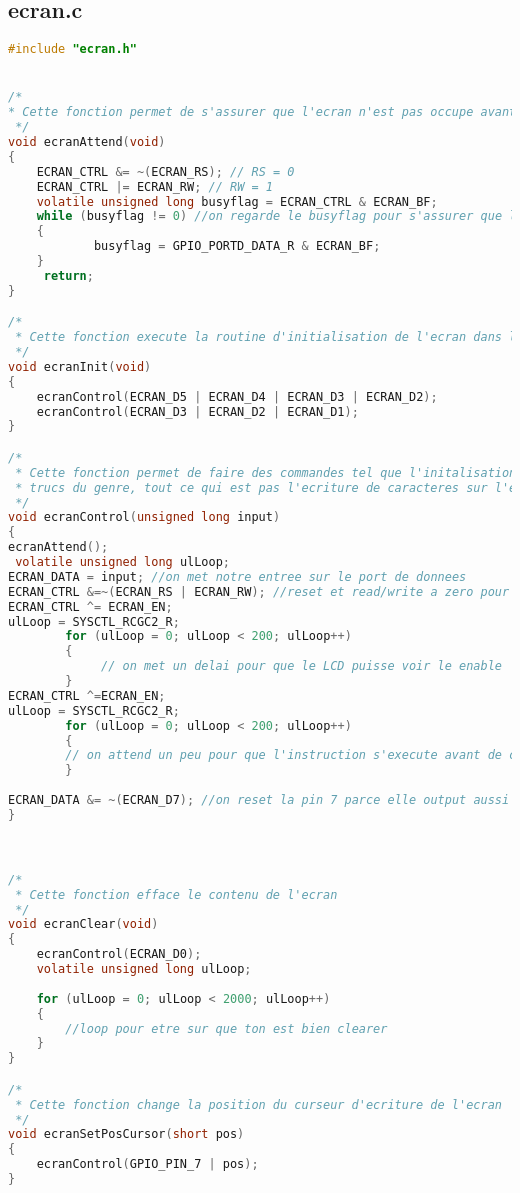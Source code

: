 \subsection{ecran.c}
\begin{lstlisting}[language=C]
#include "ecran.h"


/*
* Cette fonction permet de s'assurer que l'ecran n'est pas occupe avant d'ecrire 
 */
void ecranAttend(void)
{
    ECRAN_CTRL &= ~(ECRAN_RS); // RS = 0
    ECRAN_CTRL |= ECRAN_RW; // RW = 1
    volatile unsigned long busyflag = ECRAN_CTRL & ECRAN_BF;
    while (busyflag != 0) //on regarde le busyflag pour s'assurer que l'ecran est pas occupe
    { 
            busyflag = GPIO_PORTD_DATA_R & ECRAN_BF;
    }
     return;
}

/*
 * Cette fonction execute la routine d'initialisation de l'ecran dans le mode qu'on veut
 */
void ecranInit(void)
{
    ecranControl(ECRAN_D5 | ECRAN_D4 | ECRAN_D3 | ECRAN_D2);
    ecranControl(ECRAN_D3 | ECRAN_D2 | ECRAN_D1);
}

/*
 * Cette fonction permet de faire des commandes tel que l'initalisation, changement de positions et 
 * trucs du genre, tout ce qui est pas l'ecriture de caracteres sur l'ecran
 */
void ecranControl(unsigned long input)
{
ecranAttend();
 volatile unsigned long ulLoop;
ECRAN_DATA = input; //on met notre entree sur le port de donnees
ECRAN_CTRL &=~(ECRAN_RS | ECRAN_RW); //reset et read/write a zero pour pas qu'il re-ecrive par erreur
ECRAN_CTRL ^= ECRAN_EN;
ulLoop = SYSCTL_RCGC2_R;
        for (ulLoop = 0; ulLoop < 200; ulLoop++) 
        {
             // on met un delai pour que le LCD puisse voir le enable
        }
ECRAN_CTRL ^=ECRAN_EN;
ulLoop = SYSCTL_RCGC2_R; 
        for (ulLoop = 0; ulLoop < 200; ulLoop++) 
        {
        // on attend un peu pour que l'instruction s'execute avant de changer la pin 7
        }
 
ECRAN_DATA &= ~(ECRAN_D7); //on reset la pin 7 parce elle output aussi le busy flag et ont pas veux etre pogner dans ecranAttend()
}



/*
 * Cette fonction efface le contenu de l'ecran
 */
void ecranClear(void)
{
    ecranControl(ECRAN_D0);
    volatile unsigned long ulLoop;
    
    for (ulLoop = 0; ulLoop < 2000; ulLoop++) 
    {
        //loop pour etre sur que ton est bien clearer
    }
}

/*
 * Cette fonction change la position du curseur d'ecriture de l'ecran
 */
void ecranSetPosCursor(short pos)
{
    ecranControl(GPIO_PIN_7 | pos);
}


\end{lstlisting}
